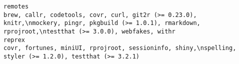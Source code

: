 \documentclass[
  letterpaper,
  DIV=11,
  numbers=noendperiod]{scrreprt}
\begin{document}
\begin{verbatim}
remotes                                                                                                                                                                                                                                                                                                                                                                                                                                                                                                                                                                                                                                                                                                                                                                                                                                                                                                                                                                                                                                                                                                                                       brew, callr, codetools, covr, curl, git2r (>= 0.23.0), knitr,\nmockery, pingr, pkgbuild (>= 1.0.1), rmarkdown, rprojroot,\ntestthat (>= 3.0.0), webfakes, withr
reprex                                                                                                                                                                                                                                                                                                                                                                                                                                                                                                                                                                                                                                                                                                                                                                                                                                                                                                                                                                                                                                                                                                                                                                                               covr, fortunes, miniUI, rprojroot, sessioninfo, shiny,\nspelling, styler (>= 1.2.0), testthat (>= 3.2.1)

\end{verbatim}
\end{document}
